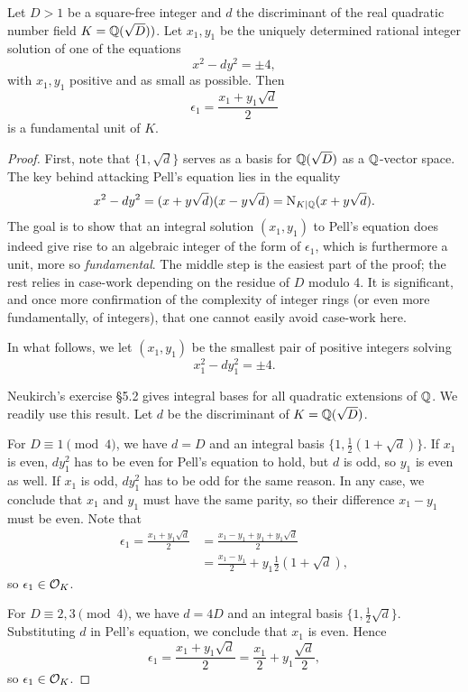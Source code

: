\begin{prop}
	Let $D>1$ be a square-free integer and $d$ the discriminant of the real quadratic number field $K=\mathbb{Q}(\sqrt{D}))$. Let $x_1,y_1$ be the uniquely determined rational integer solution of one of the equations
	\[
		x^2-dy^2=\pm 4,
	\]
	with $x_1,y_1$ positive and as small as possible. Then
	\[
		\epsilon_1 = \frac{x_1+y_1\sqrt{d}}{2}
	\]
	is a fundamental unit of $K$.
\end{prop}
\begin{proof}
	First, note that $\{1,\sqrt{d}\}$ serves as a basis for $\mathbb{Q}(\sqrt{D})$ as a $\mathbb{Q}$-vector space. The key behind attacking Pell's equation lies in the equality
	\[
		x^2-dy^2 = (x+y\sqrt{d})(x-y\sqrt{d}) = \operatorname{N}_{K\mid\mathbb{Q}}(x+y\sqrt{d}).
	\]
	The goal is to show that an integral solution $(x_1,y_1)$ to Pell's equation does indeed give rise to an algebraic integer of the form of $\epsilon_1$, which is furthermore a unit, more so \emph{fundamental}. The middle step is the easiest part of the proof; the rest relies in case-work depending on the residue of $D$ modulo 4. It is significant, and once more confirmation of the complexity of integer rings (or even more fundamentally, of integers), that one cannot easily avoid case-work here.

	In what follows, we let $(x_1,y_1)$ be the smallest pair of positive integers solving
	\[
		x_1^2-dy_1^2 = \pm 4.
	\]

	Neukirch's exercise \S 5.2 gives integral bases for all quadratic extensions of $\mathbb{Q}$. We readily use this result. Let $d$ be the discriminant of $K=\mathbb{Q}(\sqrt{D})$.

	For $D\equiv 1 \pmod{4}$, we have $d=D$ and an integral basis $\{1,\frac{1}{2}(1+\sqrt{d})\}$. If $x_1$ is even, $dy_1^2$ has to be even for Pell's equation to hold, but $d$ is odd, so $y_1$ is even as well. If $x_1$ is odd, $dy_1^2$ has to be odd for the same reason. In any case, we conclude that $x_1$ and $y_1$ must have the same parity, so their difference $x_1-y_1$ must be even. Note that
	\begin{align*}
		\epsilon_1 = \frac{x_1+y_1\sqrt{d}}{2} &= \frac{x_1-y_1+y_1+y_1\sqrt{d}}{2}\\
			&= \frac{x_1-y_1}{2} + y_1\frac{1}{2}\left(1+\sqrt{d}\right),
	\end{align*}
	so $\epsilon_1\in\mathcal{O}_K$.

	For $D\equiv 2,3 \pmod{4}$, we have $d=4D$ and an integral basis $\{1,\frac{1}{2}\sqrt{d}\}$. Substituting $d$ in Pell's equation, we conclude that $x_1$ is even. Hence
	\[
		\epsilon_1 = \frac{x_1+y_1\sqrt{d}}{2} = \frac{x_1}{2} + y_1\frac{\sqrt{d}}{2},
	\]
	so $\epsilon_1\in\mathcal{O}_K$.


\end{proof}
